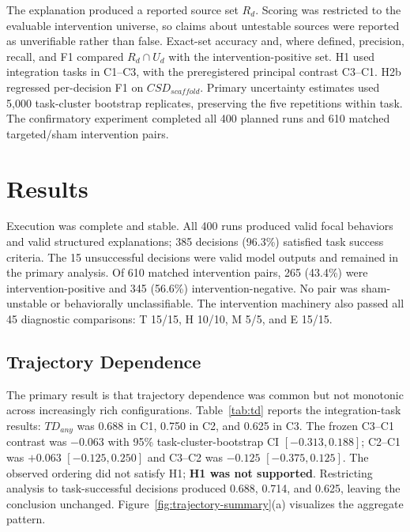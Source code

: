 \documentclass[conference]{IEEEtran}
\begin{document}
The explanation produced a reported source set $R_d$. Scoring was restricted to the evaluable intervention universe, so claims about untestable sources were reported as unverifiable rather than false. Exact-set accuracy and, where defined, precision, recall, and F1 compared $R_d\cap U_d$ with the intervention-positive set. H1 used integration tasks in C1--C3, with the preregistered principal contrast C3--C1. H2b regressed per-decision F1 on $CSD_{scaffold}$. Primary uncertainty estimates used 5,000 task-cluster bootstrap replicates, preserving the five repetitions within task. The confirmatory experiment completed all 400 planned runs and 610 matched targeted/sham intervention pairs.

\section{Results}
Execution was complete and stable. All 400 runs produced valid focal behaviors and valid structured explanations; 385 decisions (96.3\%) satisfied task success criteria. The 15 unsuccessful decisions were valid model outputs and remained in the primary analysis. Of 610 matched intervention pairs, 265 (43.4\%) were intervention-positive and 345 (56.6\%) intervention-negative. No pair was sham-unstable or behaviorally unclassifiable. The intervention machinery also passed all 45 diagnostic comparisons: T 15/15, H 10/10, M 5/5, and E 15/15.

\subsection{Trajectory Dependence}
The primary result is that trajectory dependence was common but not monotonic across increasingly rich configurations. Table~\ref{tab:td} reports the integration-task results: $TD_{any}$ was 0.688 in C1, 0.750 in C2, and 0.625 in C3. The frozen C3--C1 contrast was $-0.063$ with 95\% task-cluster-bootstrap CI $[-0.313,0.188]$; C2--C1 was $+0.063$ $[-0.125,0.250]$ and C3--C2 was $-0.125$ $[-0.375,0.125]$. The observed ordering did not satisfy H1; \textbf{H1 was not supported}. Restricting analysis to task-successful decisions produced 0.688, 0.714, and 0.625, leaving the conclusion unchanged. Figure~\ref{fig:trajectory-summary}(a) visualizes the aggregate pattern.
\end{document}
